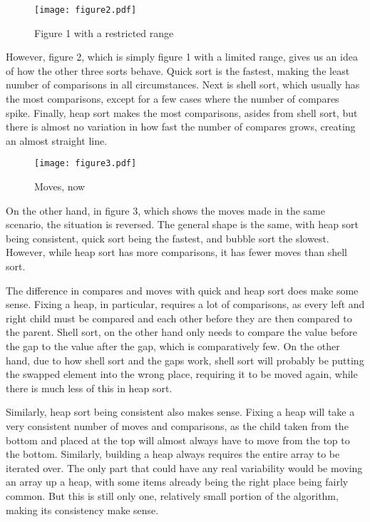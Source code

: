 \documentclass[11pt]{article}
\begin{document}
\begin{figure}[tbp]
\begin{centering}
\texttt{[image: figure2.pdf]}
\caption{Figure 1 with a restricted range}
\end{centering}
\end{figure}

However, figure 2, which is simply figure 1 with a limited range, gives us an idea of how the other three sorts behave. Quick sort is the fastest, making the least number of comparisons in all circumstances. Next is shell sort, which usually has the most comparisons, except for a few cases where the number of compares spike. Finally, heap sort makes the most comparisons, asides from shell sort, but there is almost no variation in how fast the number of compares grows, creating an almost straight line.

\begin{figure}[tbp]
\begin{centering}
\texttt{[image: figure3.pdf]}
\caption{Moves, now}
\end{centering}
\end{figure}

On the other hand, in figure 3, which shows the moves made in the same scenario, the situation is reversed. The general shape is the same, with heap sort being consistent, quick sort being the fastest, and bubble sort the slowest. However, while heap sort has more comparisons, it has fewer moves than shell sort.

The difference in compares and moves with quick and heap sort does make some sense. Fixing a heap, in particular, requires a lot of comparisons, as every left and right child must be compared and each other before they are then compared to the parent. Shell sort, on the other hand only needs to compare the value before the gap to the value after the gap, which is comparatively few. On the other hand, due to how shell sort and the gaps work, shell sort will probably be putting the swapped element into the wrong place, requiring it to be moved again, while there is much less of this in heap sort.

Similarly, heap sort being consistent also makes sense. Fixing a heap will take a very consistent number of moves and comparisons, as the child taken from the bottom and placed at the top will almost always have to move from the top to the bottom. Similarly, building a heap always requires the entire array to be iterated over. The only part that could have any real variability would be moving an array up a heap, with some items already being the right place being fairly common. But this is still only one, relatively small portion of the algorithm, making its consistency make sense.
\end{document}
